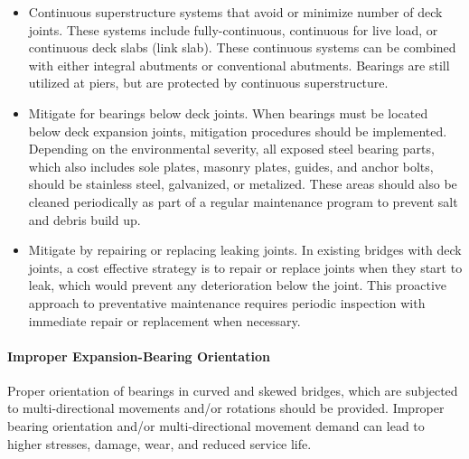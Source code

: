 \begin{itemize}
  \item Continuous superstructure systems that avoid or minimize number of deck joints. These systems include
  fully-continuous, continuous for live load, or continuous deck slabs (link slab). These continuous systems
  can be combined with either integral abutments or conventional abutments. Bearings are still utilized at
  piers, but are protected by continuous superstructure.
  \item Mitigate for bearings below deck joints. When bearings must be located below deck expansion joints,
  mitigation procedures should be implemented. Depending on the environmental severity, all exposed steel
  bearing parts, which also includes sole plates, masonry plates, guides, and anchor bolts, should be stainless
  steel, galvanized, or metalized. These areas should also be cleaned periodically as part of a regular
  maintenance program to prevent salt and debris build up.
  \item Mitigate by repairing or replacing leaking joints. In existing bridges with deck joints, a cost effective
  strategy is to repair or replace joints when they start to leak, which would prevent any deterioration below the
  joint. This proactive approach to preventative maintenance requires periodic inspection with immediate
  repair or replacement when necessary.
\end{itemize}

\paragraph{Improper Expansion-Bearing Orientation}
Proper orientation of bearings in curved and skewed bridges, which are subjected to multi-directional movements
and/or rotations should be provided. Improper bearing orientation and/or multi-directional movement demand can
lead to higher stresses, damage, wear, and reduced service life.

